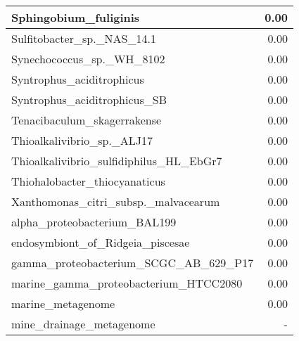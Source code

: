 \documentclass[12pt,a4paper]{article}
\begin{document}
\begin{table}[ht]
\begin{center}
\begin{tabular}{|l*{1}{|r}|}
Sphingobium\_fuliginis & 0.00 \\ \hline
Sulfitobacter\_sp.\_NAS\_14.1 & 0.00 \\ \hline
Synechococcus\_sp.\_WH\_8102 & 0.00 \\ \hline
Syntrophus\_aciditrophicus & 0.00 \\ \hline
Syntrophus\_aciditrophicus\_SB & 0.00 \\ \hline
Tenacibaculum\_skagerrakense & 0.00 \\ \hline
Thioalkalivibrio\_sp.\_ALJ17 & 0.00 \\ \hline
Thioalkalivibrio\_sulfidiphilus\_HL\_EbGr7 & 0.00 \\ \hline
Thiohalobacter\_thiocyanaticus & 0.00 \\ \hline
Xanthomonas\_citri\_subsp.\_malvacearum & 0.00 \\ \hline
alpha\_proteobacterium\_BAL199 & 0.00 \\ \hline
endosymbiont\_of\_Ridgeia\_piscesae & 0.00 \\ \hline
gamma\_proteobacterium\_SCGC\_AB\_629\_P17 & 0.00 \\ \hline
marine\_gamma\_proteobacterium\_HTCC2080 & 0.00 \\ \hline
marine\_metagenome & 0.00 \\ \hline
mine\_drainage\_metagenome & - \\ \hline
\end{tabular}
\end{center}
\end{table}
\end{document}

